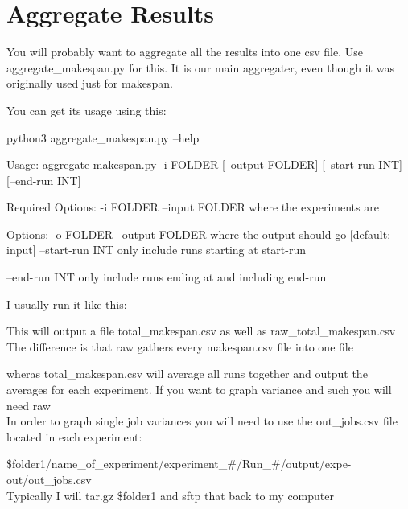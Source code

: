 \documentclass[titlepage]{article}
\let\oldsection\section
\renewcommand\section{\clearpage\oldsection}
\newenvironment{regular}{\color{black}}{}
\begin{document}
\begin{regular}
\section{Aggregate Results}
You will probably want to aggregate all the results into one csv file.
Use aggregate\_makespan.py for this.  It is our main aggregater, even though it was originally used just for makespan.

You can get its usage using this:
\begin{terminal}
python3 aggregate_makespan.py --help
\end{terminal}
\begin{terminal}
Usage:
    aggregate-makespan.py -i FOLDER [--output FOLDER] [--start-run INT] [--end-run INT]

Required Options:
    -i FOLDER --input FOLDER    where the experiments are

Options:
    -o FOLDER --output FOLDER   where the output should go
                                [default: input]
    --start-run INT             only include runs starting at start-run
                             
    --end-run INT               only include runs ending at and including end-run

\end{terminal}
I usually run it like this:
This will output a file total\_makespan.csv as well as raw\_total\_makespan.csv \\

The difference is that raw gathers every makespan.csv file into one file

wheras total\_makespan.csv will average all runs together and output the averages for each experiment.
If you want to graph variance and such you will need raw \\

In order to graph single job variances you will need to use the out\_jobs.csv file located in each experiment:

\$folder1/name\_of\_experiment/experiment\_\#/Run\_\#/output/expe-out/out\_jobs.csv \\

Typically I will tar.gz \$folder1 and sftp that back to my computer


\end{regular}
\end{document}
